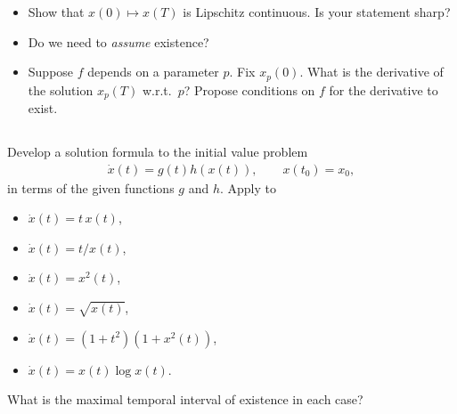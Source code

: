 \documentclass[12pt,a4paper]{article}
\begin{document}
    \begin{itemize}
    \item
        Show that 
        $x(0) \mapsto x(T)$
        is Lipschitz continuous.
        Is your statement sharp?
    \item
        Do we need to \emph{assume} existence?
    \item
        Suppose $f$ depends on a parameter $p$.
        Fix $x_p(0)$.
        What is the derivative of the solution $x_p(T)$ w.r.t.~$p$?
        Propose conditions on $f$ for the derivative to exist.
    \end{itemize}
    
    

    
    \subsection{}

    Develop a solution formula to
    the initial value problem
    \begin{align}
        \dot{x}(t) = g(t) h(x(t)),
        \qquad
        x(t_0) = x_0
        ,
    \end{align}
    in terms of the given functions $g$ and $h$.
    Apply to
    \begin{itemize}
    \item
        $\dot{x}(t) = t \, x(t)$,
    \item
        $\dot{x}(t) = t / x(t)$,
    \item
        $\dot{x}(t) = x^2(t)$,
    \item  
        $\dot{x}(t) = \sqrt{ x(t) }$,
    \item
        $\dot{x}(t) = (1 + t^2) (1 + x^2(t))$,
    \item
        $\dot{x}(t) = x(t) \log x(t)$.
    \end{itemize}
    What is the maximal temporal interval of existence in each case?

    
    \subsection{}
    
\end{document}
